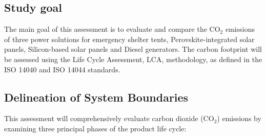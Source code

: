 \documentclass{article}
\begin{document}
\subsection{Study goal}
The main goal of this assessment is to evaluate and compare the {CO$_2$ emissions} of three power solutions for emergency shelter tents, {Perovskite-integrated solar panels}, {Silicon-based solar panels} and {Diesel generators}. The carbon footprint will be assessed using the Life Cycle Assessment, LCA, methodology, as defined in the ISO 14040 and ISO 14044 standards.
\subsection{Delineation of System Boundaries}
This assessment will comprehensively evaluate carbon dioxide (CO$_2$) emissions by examining three principal phases of the product life cycle:
\end{document}
